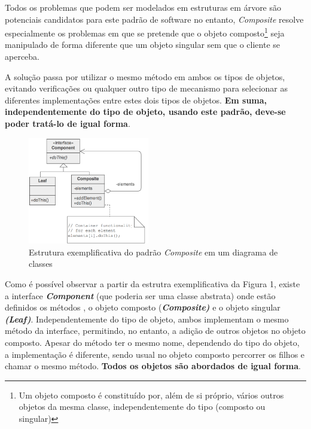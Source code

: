 \documentclass[10pt,portuguese]{article}
\begin{document}
\par Todos os problemas que podem ser modelados em estruturas em árvore são potenciais candidatos para este padrão de software no entanto, \textit{Composite} resolve especialmente os problemas em que se pretende que o objeto composto\footnote{Um objeto composto é constituído por, além de si próprio, vários outros objetos da mesma classe, independentemente do tipo (composto ou singular)} seja manipulado de forma diferente que um objeto singular sem que o cliente se aperceba. 

\par A solução passa por utilizar o mesmo método em ambos os tipos de objetos, evitando verificações ou qualquer outro tipo de mecanismo para selecionar as diferentes implementações entre estes dois tipos de objetos. \textbf{Em suma, independentemente do tipo de objeto, usando este padrão, deve-se poder tratá-lo de igual forma}.

\begin{figure}[!h]
    \centering
    \includegraphics[width=200]{images/composite/UML.png}
    \caption{Estrutura exemplificativa do padrão \textit{Composite} em um diagrama de classes}
\end{figure}

\par Como é possível observar a partir da estrutra exemplificativa da Figura 1, existe a interface \textbf{\textit{Component}} (que poderia ser uma classe abstrata) onde estão definidos os métodos , o objeto composto (\textbf{\textit{Composite)}} e o objeto singular \textit{\textbf{(Leaf)}}. Independentemente do tipo de objeto, ambos implementam o mesmo método da interface, permitindo, no entanto,  a adição de outros objetos no objeto composto. Apesar do método ter o mesmo nome, dependendo do tipo do objeto, a implementação é diferente, sendo usual no objeto composto percorrer os filhos e chamar o mesmo método. \textbf{Todos os objetos são abordados de igual forma}.
\end{document}
